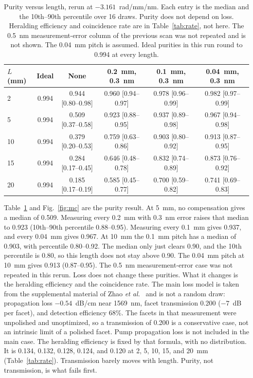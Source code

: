 \documentclass[11pt,a4paper]{article}
\begin{document}
\begin{table}[t]
\centering
\setlength{\tabcolsep}{2.2pt}
\footnotesize
\caption{Purity versus length, rerun at $-3.161$~rad/mm/nm.
Each entry is the median and the 10th--90th percentile over 16 draws.
Purity does not depend on loss.
Heralding efficiency and coincidence rate are in Table~\ref{tab:rate}, not here.
The 0.5~nm measurement-error column of the previous scan was not repeated and is not shown.
The 0.04~mm pitch is assumed.
Ideal purities in this run round to 0.994 at every length.}
\label{tab:mc}
\small
\begin{tabular}{lccccc}
\toprule
$L$ (mm) & Ideal & None & 0.2~mm, 0.3~nm & 0.1~mm, 0.3~nm & 0.04~mm, 0.3~nm \\
\midrule
2  & 0.994 & 0.944 [0.80--0.98] & 0.960 [0.94--0.97] & 0.978 [0.96--0.99] & 0.982 [0.97--0.99] \\
5  & 0.994 & 0.509 [0.37--0.58] & 0.923 [0.88--0.95] & 0.937 [0.89--0.98] & 0.967 [0.94--0.98] \\
10 & 0.994 & 0.379 [0.20--0.53] & 0.759 [0.63--0.86] & 0.903 [0.80--0.92] & 0.913 [0.87--0.95] \\
15 & 0.994 & 0.284 [0.17--0.45] & 0.646 [0.48--0.78] & 0.832 [0.74--0.89] & 0.873 [0.76--0.92] \\
20 & 0.994 & 0.185 [0.17--0.19] & 0.585 [0.45--0.77] & 0.700 [0.59--0.82] & 0.741 [0.69--0.83] \\
\bottomrule
\end{tabular}
\end{table}

Table~\ref{tab:mc} and Fig.~\ref{fig:mc} are the purity result.
At 5~mm, no compensation gives a median of 0.509.
Measuring every 0.2~mm with 0.3~nm error raises that median to 0.923 (10th--90th percentile 0.88--0.95).
Measuring every 0.1~mm gives 0.937, and every 0.04~mm gives 0.967.
At 10~mm the 0.1~mm pitch has a median of 0.903, with percentile 0.80--0.92.
The median only just clears 0.90, and the 10th percentile is 0.80, so this length does not stay above 0.90.
The 0.04~mm pitch at 10~mm gives 0.913 (0.87--0.95).
The 0.5~nm measurement-error case was not repeated in this rerun.
Loss does not change these purities.
What it changes is the heralding efficiency and the coincidence rate.
The main loss model is taken from the supplemental material of Zhao \emph{et al.}\ \cite{Zhao2020} and is not a random draw: propagation loss $-0.54$~dB/cm near 1569~nm, facet transmission 0.200 ($-7$~dB per facet), and detection efficiency 68\%.
The facets in that measurement were unpolished and unoptimized, so a transmission of 0.200 is a conservative case, not an intrinsic limit of a polished facet.
Pump propagation loss is not included in the main case.
The heralding efficiency is fixed by that formula, with no distribution.
It is 0.134, 0.132, 0.128, 0.124, and 0.120 at 2, 5, 10, 15, and 20~mm (Table~\ref{tab:rate}).
Transmission barely moves with length.
Purity, not transmission, is what fails first.
\end{document}
